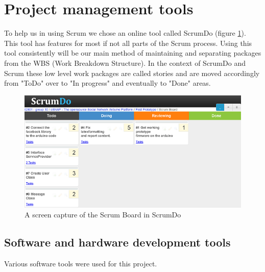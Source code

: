 \section{Project management tools}

To help us in using Scrum we chose an online tool called ScrumDo (figure \ref{fig:mgmt-scrumdo}).
This tool has features for most if not all parts of the Scrum process. Using this tool
consistently will be our main method of maintaining and separating packages from
the WBS (Work Breakdown Structure). In the context of ScrumDo and
Scrum these low level work packages are called stories and are moved
accordingly from "ToDo" over to "In progress"
and eventually to "Done" areas.
	
\begin{figure}[h!]
\centering \includegraphics{img/mgmt-scrumdo} \caption{A screen capture of the Scrum Board in ScrumDo \cite{link:scrumdo}}
\label{fig:mgmt-scrumdo}
\end{figure}

\subsection{Software and hardware development tools}
Various software tools were used for this project.

